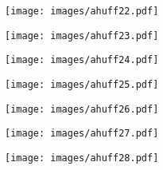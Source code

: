 \begin{frame}[allowframebreaks]
\begin{example}
  \examplebreak
                \begin{figure}[h!]
                \centering
                \texttt{[image: images/ahuff22.pdf]}
                \label{fig:ahuff22}
                \end{figure}

  \examplebreak
                \begin{figure}[h!]
                \centering
                \texttt{[image: images/ahuff23.pdf]}
                \label{fig:ahuff23}
                \end{figure}

  \examplebreak
                \begin{figure}[h!]
                \centering
                \texttt{[image: images/ahuff24.pdf]}
                \label{fig:ahuff24}
                \end{figure}

  \examplebreak
                \begin{figure}[h!]
                \centering
                \texttt{[image: images/ahuff25.pdf]}
                \label{fig:ahuff25}
                \end{figure}

  \examplebreak
                \begin{figure}[h!]
                \centering
                \texttt{[image: images/ahuff26.pdf]}
                \label{fig:ahuff26}
                \end{figure}

  \examplebreak
                \begin{figure}[h!]
                \centering
                \texttt{[image: images/ahuff27.pdf]}
                \label{fig:ahuff27}
                \end{figure}

  \examplebreak
                \begin{figure}[h!]
                \centering
                \texttt{[image: images/ahuff28.pdf]}
                \label{fig:ahuff28}
                \end{figure}

  \end{example}
\end{frame}

